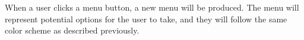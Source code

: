 When a user clicks a menu button, a new menu will be produced.
The menu will represent potential options for the user to take, and they will follow the same color scheme as described previously.

